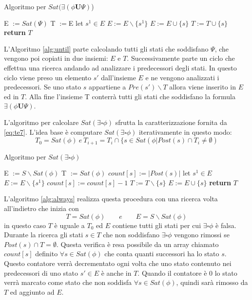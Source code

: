 \documentclass[a4paper, 10pt]{article}
\numberwithin{equation}{theor}
\begin{document}
\begin{algorithm}
\label{alg:until}
\caption{Algoritmo per $Sat(\exists(\phi \boldsymbol{U} \Psi)$)}
\begin{algorithmic}[1]
\State E $:= Sat(\Psi)$
\State T $:=$E
\State let $s^{1} \in E$
\State $E:=E \backslash \{s^{1}\}$
\State $E:= E \cup \{s\}$
\State $T:=T \cup\{s\}$
\EndIf
\EndFor
\EndWhile
\State \textbf{return} $T$
\EndProcedure
\end{algorithmic}
\end{algorithm}
L'Algoritmo \ref{alg:until} parte calcolando tutti gli stati che soddisfano $\Psi$, che vengono poi copiati in due insiemi: $E$ e $T$. Successivamente parte un ciclo che effettua una ricerca andando ad analizzare i predecessori degli stati. In questo ciclo viene preso un elemento $s'$ dall'insieme $E$ e ne vengono analizzati i predecessori. Se uno stato $s$ appartiene a  $Pre(s') \backslash T$ allora viene inserito in $E$ ed in $T$. Alla fine l'insieme T conterrà tutti gli stati che soddisfano la formula  $\exists(\phi \boldsymbol{U} \Psi)$.\par
L'algoritmo per calcolare $Sat(\exists \square \phi)$ sfrutta la caratterizzazione fornita da \ref{eq:te7}. L'idea base è computare $Sat(\exists \square \phi)$ iterativamente in questo modo:
$$T_{0} = Sat(\phi)\ e \ T_{i+1} = T_{i} \cap \{s \in Sat(\phi | Post(s) \cap T_{i} \neq \emptyset)$$
\begin{algorithm}
\label{alg:always}
\caption{Algoritmo per $Sat(\exists \square \phi)$}
\begin{algorithmic}[1]
\State E $:= S \backslash Sat(\phi)$
\State T $:=Sat(\phi)$
\State $count[s] := |Post(s)|$
\EndFor
{}
\State let $s^{1} \in E$
\State $E:=E \backslash \{s^{1}\}$
\State $count[s] := count[s]-1$
\State $T := T \backslash \{s\}$
\State $E := E \cup \{s\}$
\EndIf
\EndIf
\EndFor
\EndWhile
\State \textbf{return} $T$
\EndProcedure
\end{algorithmic}
\end{algorithm}
L'algoritmo \ref{alg:always} realizza questa procedura con una ricerca volta all'indietro che inizia con
$$T = Sat(\phi) \qquad e \qquad E = S\backslash Sat(\phi)$$
in questo caso $T$ è uguale a $T_{0}$ ed $E$ contiene tutti gli stati per cui $\exists \square \phi$ è falsa. Durante la ricerca gli stati $s \in T$ che non soddisfano $\exists \square \phi$ vengono rimossi se $Post(s) \cap T = \emptyset$.
Questa verifica è resa possibile da un array chiamato 
$count[s]$ definito $\forall s \in Sat(\phi)$ che conta quanti successori ha lo stato $s$. Questo contatore verrà decrementato ogni volta che uno stato contenuto nei predecessori di uno stato $s' \in E$ è anche in $T$. Quando il contatore è $0$ lo stato verrà marcato come stato che non soddisfa $\forall s \in Sat(\phi)$, quindi sarà rimosso da $T$ ed aggiunto ad $E$.
\end{document}
